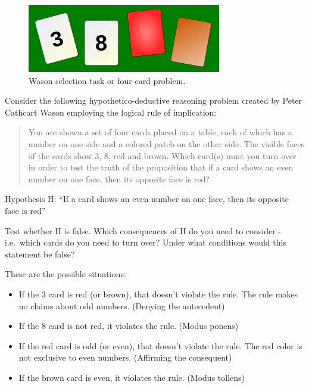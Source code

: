 \documentclass[
]{book}
\providecommand{\tightlist}{%
  \setlength{\itemsep}{0pt}\setlength{\parskip}{0pt}}
\begin{document}
\begin{figure}[hbtp]

{\centering \includegraphics[width=0.25\linewidth]{Figures/wason_cards} 

}

\caption{Wason selection task or four-card problem.}\label{fig:wason-cards}
\end{figure}

Consider the following hypothetico-deductive reasoning problem created by Peter Cathcart Wason employing the logical rule of implication:

\begin{quote}
You are shown a set of four cards placed on a table, each of which has a number on one side and a colored patch on the other side. The visible faces of the cards show 3, 8, red and brown. Which card(s) must you turn over in order to test the truth of the proposition that if a card shows an even number on one face, then its opposite face is red?
\end{quote}

Hypothesis H: ``If a card shows an even number on one face, then its opposite face is red''

Test whether H is false. Which consequences of H do you need to consider - i.e.~which cards do you need to turn over? Under what conditions would this statement be false?

These are the possible situations:

\begin{itemize}
\tightlist
\item
  If the 3 card is red (or brown), that doesn't violate the rule. The rule makes no claims about odd numbers. (Denying the antecedent)
\item
  If the 8 card is not red, it violates the rule. (Modus ponens)
\item
  If the red card is odd (or even), that doesn't violate the rule. The red color is not exclusive to even numbers. (Affirming the consequent)
\item
  If the brown card is even, it violates the rule. (Modus tollens)
\end{itemize}
\end{document}
